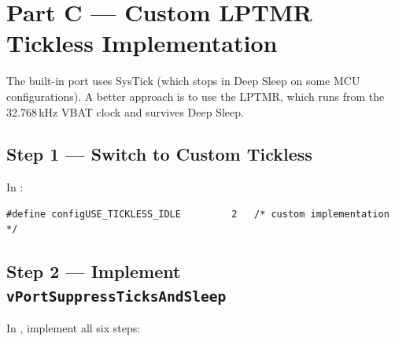 \documentclass[11pt, a4paper]{article}
\begin{document}
\section{Part C --- Custom LPTMR Tickless Implementation}

The built-in port uses SysTick (which stops in Deep Sleep on some MCU configurations).
A better approach is to use the LPTMR, which runs from the 32.768\,kHz VBAT clock and
survives Deep Sleep.

\subsection{Step 1 --- Switch to Custom Tickless}

In :

\begin{lstlisting}[style=cstyle]
#define configUSE_TICKLESS_IDLE         2   /* custom implementation */
\end{lstlisting}

\subsection{Step 2 --- Implement \texttt{vPortSuppressTicksAndSleep}}

In , implement all six steps:
\end{document}
